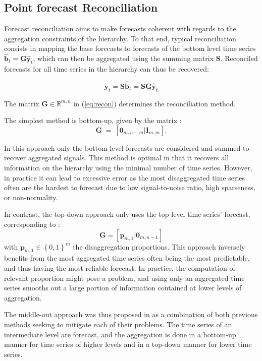 \documentclass[letterpaper]{article}
\begin{document}
\subsection{Point forecast Reconciliation} \label{point_rec}

Forecast reconciliation aims to make forecasts coherent with regards to the aggregation constraints of the hierarchy. 
To that end, typical reconciliation consists in mapping the base forecasts to forecasts of the bottom level time series $\hat{\mathbf{b}}_t = \mathbf{G}\hat{\mathbf{y}}_t$, which can then be aggregated using the summing matrix $\mathbf{S}$. 
Reconciled forecasts for all time series in the hierarchy can thus be recovered: 

\begin{equation}
\tilde{\mathbf{y}}_t = \mathbf{S}\hat{\mathbf{b}}_t = \mathbf{SG}\hat{\mathbf{y}}_t
\label{eq:recon}
\end{equation}

The matrix $\mathbf{G} \in \mathbb{R}^{m,n}$ in (\ref{eq:recon}) determines the reconciliation method. 

The simplest method is bottom-up, given by the matrix :  \[ \mathbf{G}~=~[\mathbf{0}_{m,n-m}|\mathbf{I}_{m,m}]. \]

In this approach only the bottom-level forecasts are considered and summed to recover aggregated signals. 
This method is optimal in that it recovers all information on the hierarchy using the minimal number of time series. 
However, in practice it can lead to excessive error as the most disaggregated time series often are the hardest to forecast due to low signal-to-noise ratio, high sparseness, or non-normality. 

In contrast, the top-down approach only uses the top-level time series' forecast, corresponding to : \[\mathbf{G} = [\mathbf{p}_{m,1}|\mathbf{0}_{m,n-1}] \] with $\mathbf{p}_{m,1}\in \left\{ 0,1\right\}^m$ the disaggregation proportions.
This approach inversely benefits from the most aggregated time series often being the most predictable, and thus having the most reliable forecast. 
In practice, the computation of relevant proportion might pose a problem, and using only an aggregated time series smooths out a large portion of information contained at lower levels of aggregation. 

The middle-out approach was thus proposed in \cite{bookhyndman} as a combination of both previous methods seeking to mitigate each of their problems.
The time series of an intermediate level are forecast, and the aggregation is done in a bottom-up manner for time series of higher levels and in a top-down manner for lower time series. 
\end{document}
